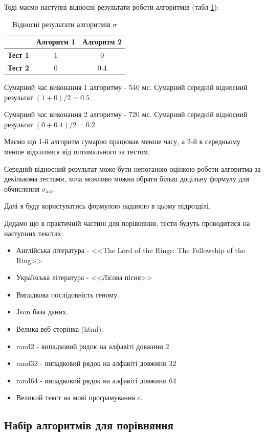 \documentclass[a4paper,14pt]{extarticle} %
\begin{document}
	Тоді маємо наступні відносні результати роботи алгоритмів (табл \ref{table:relative_times}):
	\begin{table}[H]
		\centering
		\begin{tabular}{|c|c|c|}
			\hline
			& \textbf{Алгоритм 1} & \textbf{Алгоритм 2} \\ 
			\hline
			\textbf{Тест 1} & 1 & 0 \\ 
			\hline
			\textbf{Тест 2} & 0 & 0.4 \\ 
			\hline
		\end{tabular}
		\caption{Відносні результати алгоритмів $\sigma$}
		\label{table:relative_times}
	\end{table}

	Сумарний час виконання 1 алгоритму - 540 мс. Сумарний середній відносний результат $(1+0)/2=0.5$.

	Сумарний час виконання 2 алгоритму - 720 мс. Сумарний середній відносний результат $(0+0.4)/2=0.2$.

	Маємо що 1-й алгоритм сумарно працював менше часу, а 2-й в середньому менше відхилявся від оптимального за тестом.

	Середній відносний результат може бути непоганою оцінкою роботи алгоритма за декількома тестами, хоча можливо можна обрати більш доцільну формулу для обчислення $\sigma_{\text{алг}}$.

	Далі я буду користуватись формулою наданою в цьому підрозділі.

	Додамо що в практичній частині для порівняння, тести будуть проводитися на наступних текстах:

	\begin{itemize}
		\item Англійська література - <<The Lord of the Rings: The Fellowship of the Ring>>
		\item Українська література - <<Лісова пісня>>
		\item Випадкова послідовність геному.
		\item Json база даних.
		\item Велика веб сторінка (html).
		\item rand2 - випадковий рядок на алфавіті довжини 2
		\item rand32 - випадковий рядок на алфавіті довжини 32
		\item rand64 - випадковий рядок на алфавіті довжини 64
		\item Великий текст на мові програмування $c$.
	\end{itemize}
	\subsection{Набір алгоритмів для порівняння} \label{section:algorithms_set}
\end{document}
